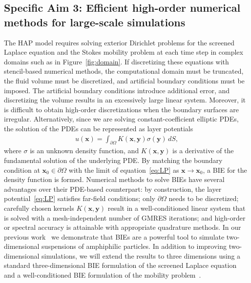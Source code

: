 
\subsection{Specific Aim 3: Efficient high-order numerical methods for
large-scale simulations}
\label{subsec:specific_aim_3}
The HAP model requires solving exterior Dirichlet problems for the
screened Laplace equation and the Stokes mobility problem at each time
step in complex domains such as in Figure~\ref{fig:domain}. If
discretizing these equations with stencil-based numerical methods, the
computational domain must be truncated, the fluid volume must be
discretized, and artificial boundary conditions must be imposed. The
artificial boundary conditions introduce additional error, and
discretizing the volume results in an excessively large linear system.
Moreover, it is difficult to obtain high-order discretizations when the
boundary surfaces are irregular. Alternatively, since we are solving
constant-coefficient elliptic PDEs, the solution of the PDEs can be
represented as layer potentials
\begin{align}
  \label{eq:LP}
  u(\mathbf{x}) = \int_{\partial\Omega} K(\mathbf{x},\mathbf{y})
  \sigma(\mathbf{y})\,dS,
\end{align}
where $\sigma$ is an unknown density function, and
$K(\mathbf{x},\mathbf{y})$ is a derivative of the fundamental solution
of the underlying PDE. By matching the boundary condition at
$\mathbf{x}_0 \in \partial\Omega$ with the limit of
equation~\eqref{eq:LP} as $\mathbf{x}\rightarrow \mathbf{x}_0$, a BIE
for the density function is formed. Numerical methods to solve BIEs have
several advantages over their PDE-based counterpart: by construction,
the layer potential~\eqref{eq:LP} satisfies far-field conditions; only
$\partial\Omega$ needs to be discretized; carefully chosen kernels
$K(\mathbf{x},\mathbf{y})$ result in a well-conditioned linear system
that is solved with a mesh-independent number of GMRES iterations; and
high-order or spectral accuracy is attainable with appropriate
quadrature methods. In our previous work~\cite{Fu2018_SIAM} we
demonstrate that BIEs are a powerful tool to simulate two-dimensional
suspensions of amphiphilic particles. In addition to improving
two-dimensional simulations, we will extend the results to three
dimensions using a standard three-dimensional BIE formulation of the
screened Laplace equation~\cite{ying_2006} and a well-conditioned BIE
formulation of the mobility problem~\cite{manasthesis, rac-gre2016}.

